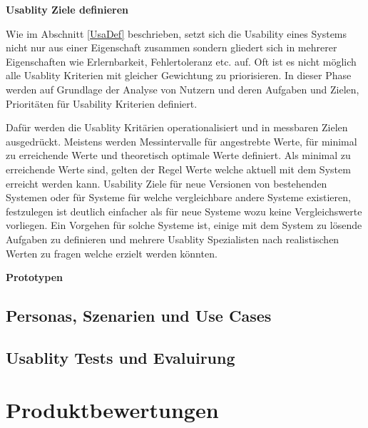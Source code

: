 \vspace{10mm} 
\textbf{Usablity Ziele definieren} 

Wie im Abschnitt \ref{UsaDef} beschrieben, setzt sich die Usability eines Systems nicht nur aus einer Eigenschaft zusammen sondern gliedert sich in mehrerer Eigenschaften wie Erlernbarkeit, Fehlertoleranz etc. auf. 
Oft ist es nicht möglich alle Usablity Kriterien mit gleicher Gewichtung zu priorisieren. In dieser Phase werden auf Grundlage der Analyse von Nutzern und deren Aufgaben und Zielen, Prioritäten für Usability Kriterien definiert. 

Dafür werden die Usablity Kritärien operationalisiert und in messbaren Zielen ausgedrückt. Meistens werden Messintervalle für angestrebte Werte, für minimal zu erreichende Werte und theoretisch optimale Werte definiert. 
Als minimal zu erreichende Werte sind, gelten der Regel Werte welche aktuell mit dem System erreicht werden kann. Usability Ziele für neue Versionen von bestehenden Systemen oder für Systeme für welche vergleichbare andere 
Systeme existieren, festzulegen ist deutlich einfacher als für neue Systeme wozu keine Vergleichswerte vorliegen. Ein Vorgehen für solche Systeme ist, einige mit dem System zu lösende Aufgaben zu definieren und mehrere Usablity Spezialisten nach realistischen Werten zu fragen welche erzielt werden könnten.

\vspace{10mm} 
\textbf{Prototypen}





\subsection{Personas, Szenarien und Use Cases}




\subsection{Usablity Tests und Evaluirung}

\section{Produktbewertungen}


